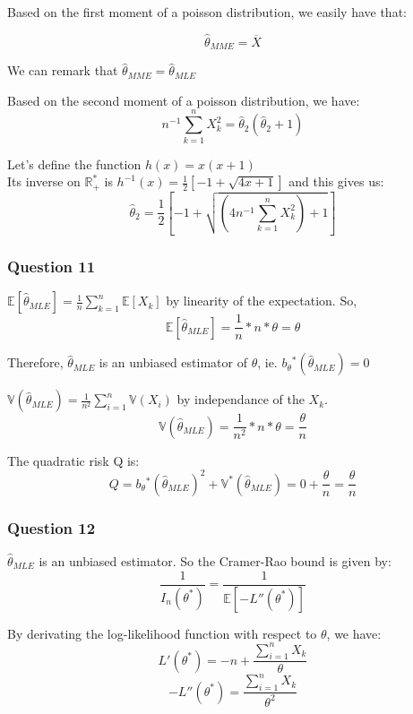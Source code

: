 \documentclass[]{article}
\begin{document}
Based on the first moment of a poisson distribution, we easily have
that:

\[\hat \theta_{MME} = \overline{X}\]

We can remark that \(\hat \theta_{MME} = \hat \theta_{MLE}\)

Based on the second moment of a poisson distribution, we have:
\[n^{-1} \sum _{k=1} ^{n} X_k^2 = \hat \theta_{2} (\hat \theta_{2} + 1)\]

Let's define the function \(h(x) = x(x + 1)\)\\
Its inverse on \(\mathbb{R}_+^*\) is
\(h^{-1} (x) = \frac {1}{2} [- 1 + \sqrt{4 x + 1}]\) and this gives us:
\[\hat \theta_{2} = \frac {1}{2} [- 1 + \sqrt{(4 n^{-1} \sum _{k=1} ^{n} X_k^2) + 1}]\]

\hypertarget{question-11}{%
\subsubsection{Question 11}\label{question-11}}

\(\mathbb{E} [\hat\theta_{MLE}] = \frac{1}{n} \sum_{k=1}^{n} \mathbb{E}[X_k]\)
by linearity of the expectation. So,
\[\mathbb{E} [\hat\theta_{MLE}] = \frac{1}{n} * n * \theta = \theta\]

Therefore, \(\hat\theta_{MLE}\) is an unbiased estimator of \(\theta\),
ie. \(b_\theta{^*}(\hat\theta_{MLE}) = 0\)

\(\mathbb{V} (\hat\theta_{MLE}) = \frac{1}{n^2} \sum_{i=1}^{n} \mathbb{V}(X_i)\)
by independance of the \(X_k\).
\[\mathbb{V} (\hat\theta_{MLE}) = \frac{1}{n^2} * n * \theta = \frac{\theta}{n}\]

The quadratic risk Q is:
\[Q = b_\theta{^*}(\hat\theta_{MLE})^2 + \mathbb{V^*} (\hat\theta_{MLE}) = 0 + \frac{\theta}{n} = \frac{\theta}{n}\]

\hypertarget{question-12}{%
\subsubsection{Question 12}\label{question-12}}

\(\hat\theta_{MLE}\) is an unbiased estimator. So the Cramer-Rao bound
is given by:\\
\[\frac{1}{I_n(\theta^*)} = \frac{1}{\mathbb{E} [-L''(\theta^*)]}\]

By derivating the log-likelihood function with respect to \(\theta\), we
have: \[L'(\theta^*) = -n + \frac{\sum_{i=1}^{n} X_k}{\theta}\]
\[-L''(\theta^*) = \frac{\sum_{i=1}^{n} X_k}{\theta^2}\]
\end{document}
